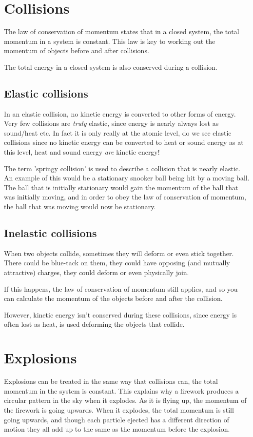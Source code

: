 \documentclass{article}
\begin{document}
\section*{Collisions}
\label{sec:Collisions}
The law of conservation of momentum states that in a closed system, the total momentum in a system is constant. This law is key to working out the momentum of objects before and after collisions.

The total energy in a closed system is also conserved during a collision.


\subsection*{Elastic collisions}
\label{sec:ElasticCollisions}
In an elastic collision, no kinetic energy is converted to other forms of energy.
Very few collisions are \textit{truly} elastic, since energy is nearly always lost as sound/heat etc. In fact it is only really at the atomic level, do we see elastic collisions since no kinetic energy can be converted to heat or sound energy as at this level, heat and sound energy \textit{are} kinetic energy!

The term 'springy collision' is used to describe a collision that is nearly elastic. An example of this would be a stationary snooker ball being hit by a moving ball. The ball that is initially stationary would gain the momentum of the ball that was initially moving, and in order to obey the law of conservation of momentum, the ball that was moving would now be stationary.


\subsection*{Inelastic collisions}
\label{sec:InelasticCollisions}
When two objects collide, sometimes they will deform or even stick together. There could be blue-tack on them, they could have opposing (and mutually attractive) charges, they could deform or even physically join.

If this happens, the law of conservation of momentum still applies, and so you can calculate the momentum of the objects before and after the collision.

However, kinetic energy isn't conserved during these collisions, since energy is often lost as heat, is used deforming the objects that collide.


\section*{Explosions}
\label{sec:Explosions}
Explosions can be treated in the same way that collisions can, the total momentum in the system is constant. This explains why a firework produces a circular pattern in the sky when it explodes. As it is flying up, the momentum of the firework is going upwards. When it explodes, the total momentum is still going upwards, and though each particle ejected has a different direction of motion they all add up to the same as the momentum before the explosion.
\end{document}
